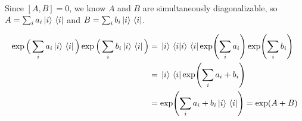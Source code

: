 \exercise
Since $[A, B] = 0$, we know $A$ and $B$ are simultaneously diagonalizable, so $A = \sum_{i} a_{i} \ket*{i} \bra*{i}$ and $B = \sum_{i} b_{i} \ket*{i} \bra*{i}$. 

$$
\begin{aligned}
\exp \Big( \sum_{i} a_{i} \ket*{i} \bra*{i} \Big) \exp \Big( \sum_{i} b_{i} \ket*{i} \bra*{i} \Big) &= \ket*{i} \bra*{i} \ket*{i} \bra*{i}  \exp (\sum_{i} a_{i} ) \exp (\sum_{i} b_{i})  \\
&=\ket*{i} \bra*{i} \exp ( \sum_{i} a_{i} + b_{i} )\\
&= \exp (\sum_{i} a_{i} + b_{i} \ket*{i} \bra*{i} ) = \exp(A + B)
\end{aligned}
$$